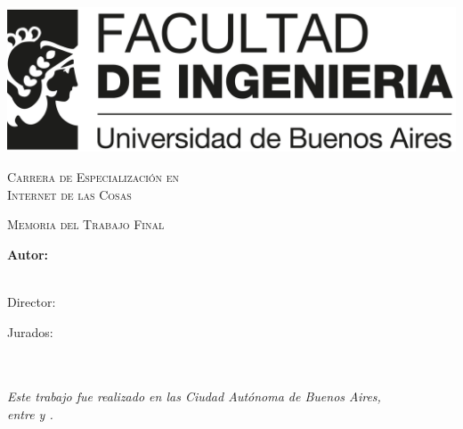 \documentclass[
11pt,
spanish,
singlespacing,
parskip,
headsepline,
]{MastersDoctoralThesis}
\author{Ing. Gonzalo Nahuel Vaca} %
\begin{document}
\frontmatter

\pagestyle{plain}


\begin{titlepage}
\begin{center}


\includegraphics[width=.8\textwidth]{./Figures/logoFIUBA.png}
\vspace{2cm}

\textsc{\huge{Carrera de Especialización en\\ \vspace{5px} Internet de las Cosas}}
\vspace{.5cm}

\textsc{\Large Memoria del Trabajo Final}\\[1cm]

{\huge \bfseries \ttitle\par}\vspace{0.4cm}

\vfill

\vspace{2cm}
\LARGE\textbf{Autor:\\
\authorname}\\

\vspace{1.5cm}

\large
{Director:} \\
{\supname}
 
\vspace{1cm}
Jurados:\\	
\jurunoname\\
\jurdosname\\
\jurtresname

\vspace{2cm}

\textit{Este trabajo fue realizado en las Ciudad Autónoma de Buenos Aires,\\ entre \fechaINICIOname \hspace{1px} y \fechaFINALname.}
\end{center}
\end{titlepage}
\end{document}
